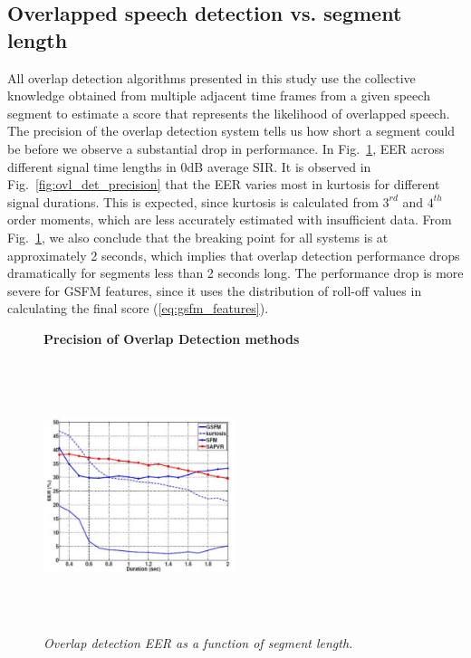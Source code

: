 {\subsection{Overlapped speech detection vs. segment length}
\label{sssec:ovl_frame_vs_seg_gsfm}
All overlap detection algorithms presented in this study use the collective knowledge obtained from multiple adjacent time frames from a given speech segment to estimate a score that represents the likelihood of overlapped speech. 
The precision of the overlap detection system tells us how short a segment could be before we observe a substantial drop in performance. 
In Fig.~\ref{fig:ovl_det_precision_gsfm}, EER across different signal time lengths in 0dB average SIR. 
It is observed in Fig.~\ref{fig:ovl_det_precision} that the EER varies most in kurtosis for different signal durations. 
This is expected, since kurtosis is calculated from $3^{rd}$ and $4^{th}$ order moments, which are less accurately estimated with insufficient data. 
From Fig.~\ref{fig:ovl_det_precision_gsfm}, we also conclude that the breaking point for all systems is at approximately 2 seconds, which implies that overlap detection performance drops dramatically for segments less than 2 seconds long. 
The performance drop is more severe for GSFM features, since it uses the distribution of roll-off values in calculating the final score (\ref{eq:gsfm_features}). 

\begin{figure}[h!]
	\centering
	\hspace{-1mm}
	\textbf{Precision of Overlap Detection methods}\par\medskip
	\includegraphics[height = 3.1in, width=0.5\textwidth]{figures/eer_vs_time_gsfm}
	\vspace{-1mm}
	\caption{\it Overlap detection EER as a function of segment length. }
	\vspace{0mm}
	\label{fig:ovl_det_precision_gsfm}
\end{figure}


}
